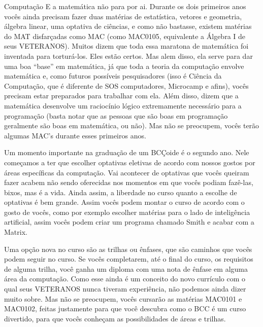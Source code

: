 \begin{subsecao}{Computação}
E a matemática não para por ai. Durante os dois primeiros anos vocês ainda
precisam fazer duas matérias de estatística, vetores e geometria, álgebra linear, uma
optativa de ciências, e como não bastasse, existem matérias do MAT disfarçadas
como MAC (como MAC0105, equivalente a Álgebra I de seus VETERANOS). Muitos dizem
que toda essa maratona de matemática foi inventada para torturá-los. Eles estão
certos. Mas alem disso, ela serve para dar uma boa ``base'' em matemática, já
que toda a teoria da computação envolve matemática e, como futuros possíveis
pesquisadores (isso é Ciência da Computação, que é diferente de SOS
computadores, Microcamp e afins), vocês precisam estar preparados para trabalhar
com ela. Além disso, dizem que a matemática desenvolve um raciocínio lógico
extremamente necessário para a programação (basta notar que as pessoas que são
boas em programação geralmente são boas em matemática, ou não). Mas não se
preocupem, vocês terão algumas MAC's durante esses primeiros anos.

Um momento importante na graduação de um BCÇoide é o segundo ano. Nele começamos
a ter que escolher optativas eletivas de acordo com nossos gostos por áreas
específicas da computação. Vai acontecer de optativas que vocês queiram fazer
acabem não sendo oferecidas nos momentos em que vocês podiam fazê-las, bixos,
mas é a vida. Ainda assim, a liberdade no curso quanto a escolhe de optativas é
bem grande. Assim vocês podem montar o curso de acordo com o gosto de vocês,
como por exemplo escolher matérias para o lado de inteligência artificial, assim
vocês podem criar um programa chamado Smith e acabar com a Matrix.

Uma opção nova no curso são as trilhas ou ênfases, que são caminhos que vocês
podem seguir no curso. Se vocês completarem, até o final do curso, os requisitos
de alguma trilha, você ganha um diploma com uma nota de ênfase em alguma área da
computação. Como esse ainda é um conceito do novo currículo com o qual seus
VETERANOS nunca tiveram experiência, não podemos ainda dizer muito sobre. Mas
não se preocupem, vocês cursarão as matérias MAC0101 e MAC0102, feitas
justamente para que você descubra como o BCC é um curso divertido, para que
vocês conheçam as possibilidades de áreas e trilhas.


\end{subsecao}
